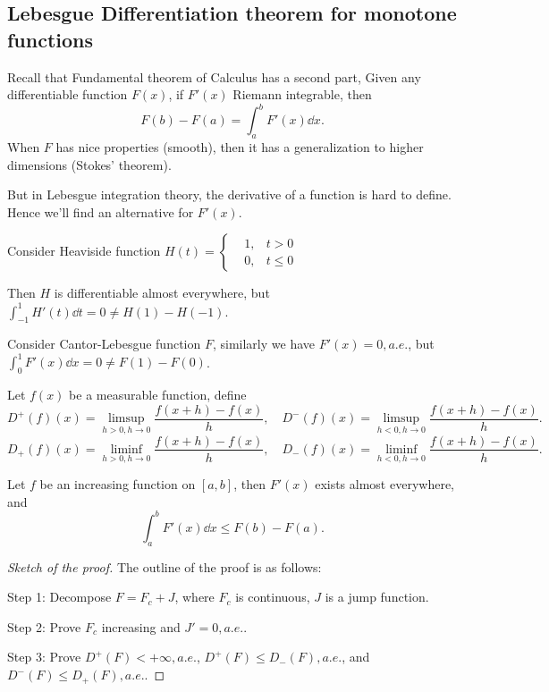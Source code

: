 \subsection{Lebesgue Differentiation theorem for monotone functions}
\label{sub:Lebesgue Differentiation theorem for monotone functions}

Recall that Fundamental theorem of Calculus has a second part,
Given any differentiable function $F(x)$, if $F'(x)$ Riemann integrable,
then
 \[
F(b)-F(a) = \int_a^b F'(x)\dd x.
\]
When $F$ has nice properties (smooth), then it has a generalization to
higher dimensions (Stokes' theorem).

But in Lebesgue integration theory, the derivative of a function
is hard to define. Hence we'll find an alternative for $F'(x)$.

\begin{example}
	Consider Heaviside function $H(t) = \left\{\begin{aligned}
			&1, &t>0\\ &0, &t\le 0
    \end{aligned} \right.$

	Then $H$ is differentiable almost everywhere,
	but $\int_{-1}^1 H'(t)\dd t = 0 \ne H(1)-H(-1)$.
\end{example}
\begin{example}
    Consider Cantor-Lebesgue function $F$,
	similarly we have $F'(x)=0, a.e.$,
	but  $\int_0^1 F'(x)\dd x = 0\ne F(1)-F(0)$.
\end{example}

\begin{definition}
	Let $f(x)$ be a measurable function, define
	\[
	D^+(f)(x) = \limsup_{h>0, h\to 0}\frac{f(x+h)-f(x)}{h},\quad
	D^-(f)(x) = \limsup_{h<0, h\to 0}\frac{f(x+h)-f(x)}{h}.
	\]
	\[
	D_+(f)(x) = \liminf_{h>0, h\to 0}\frac{f(x+h)-f(x)}{h},\quad
	D_-(f)(x) = \liminf_{h<0, h\to 0}\frac{f(x+h)-f(x)}{h}.
	\]
\end{definition}

\begin{theorem}
	\label{LebesgueIncreasing}
	Let $f$ be an increasing function on $[a,b]$,
	then $F'(x)$ exists almost everywhere, and
	\[
	\int_{a}^{b} F'(x)\dd x \le F(b) - F(a).
	\]
\end{theorem}
\begin{proof}[Sketch of the proof]
	The outline of the proof is as follows:

    Step 1: Decompose $F = F_c + J$, where $F_c$ is continuous, $J$ is a jump function.

	Step 2: Prove $F_c$ increasing and  $J'=0, a.e.$.

	Step 3: Prove $D^+(F)<+\infty, a.e.$, $D^+(F)\le D_-(F), a.e.$,
	and $D^-(F)\le D_+(F),a.e.$.
\end{proof}

